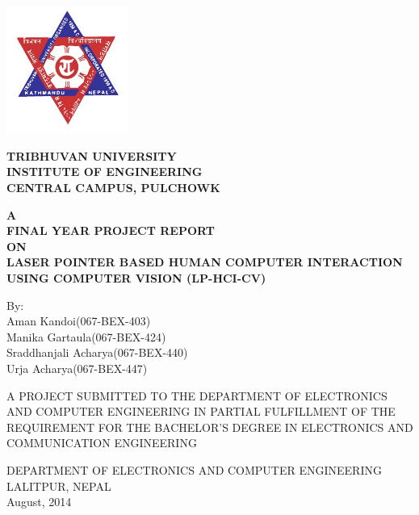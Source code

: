 \begin{titlepage}
    \begin{center}
        \vspace*{0.5cm}
        
        \begin{center}
        \includegraphics[width=0.3\textwidth]{logo}
        \end{center}
        
        \large
        {\textbf{TRIBHUVAN UNIVERSITY} \\
        \textbf{INSTITUTE OF ENGINEERING} \\
        \textbf{CENTRAL CAMPUS, PULCHOWK}\\}
        
        \vspace{1cm}
        
        \normalsize
        \textbf{A \\FINAL YEAR PROJECT REPORT\\ ON\\
       LASER POINTER BASED HUMAN­ COMPUTER INTERACTION USING COMPUTER VISION (LP­-HCI-­CV)}

		\vspace{1cm}
        
        By:\\
        Aman Kandoi(067-­BEX-­403)\\
Manika Gartaula(067­-BEX-­424)\\
Sraddhanjali Acharya(067­-BEX-­440)\\
Urja Acharya(067­-BEX-­447)\\

        
        \vspace{1cm}
        
        A PROJECT SUBMITTED TO THE DEPARTMENT OF ELECTRONICS AND
COMPUTER ENGINEERING IN PARTIAL FULFILLMENT OF THE
REQUIREMENT FOR THE BACHELOR’S DEGREE IN
ELECTRONICS AND COMMUNICATION ENGINEERING\\
    \vspace{2cm}

DEPARTMENT OF ELECTRONICS AND COMPUTER ENGINEERING\\
LALITPUR, NEPAL\\
August, 2014

        
        
    \end{center}
\end{titlepage}